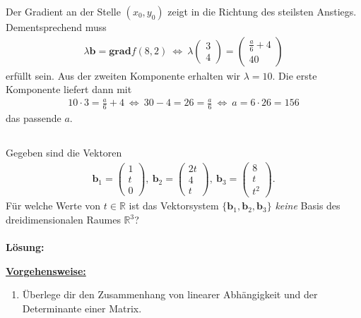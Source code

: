 Der Gradient an der Stelle $ (x_0,y_0) $ zeigt in die Richtung des steilsten Anstiegs. Dementsprechend muss
\begin{align*}
\lambda \textbf{b} = \textbf{grad} f(8,2)
\ \Leftrightarrow \
\lambda 
\begin{pmatrix}
3 \\ 4
\end{pmatrix}
= 
\begin{pmatrix}
\frac{a}{6} + 4\\
40
\end{pmatrix}
\end{align*}
erfüllt sein. Aus der zweiten Komponente erhalten wir $ \lambda = 10 $.
Die erste Komponente liefert dann mit
\begin{align*}
10 \cdot 3 = \frac{a}{6} + 4
\ \Leftrightarrow \
30  - 4 = 26 =  \frac{a}{6}
\ \Leftrightarrow \
a = 6 \cdot 26 = 156
\end{align*}
das passende $ a $.


\newpage

\subsection*{}
Gegeben sind die Vektoren
\begin{align*}
\textbf{b}_1 =
\begin{pmatrix}
1 \\
t\\ 
0
\end{pmatrix},
\
\textbf{b}_2 =
\begin{pmatrix}
2t \\
4\\ 
t
\end{pmatrix},
\
\textbf{b}_3 =
\begin{pmatrix}
8 \\
t\\ 
t^2
\end{pmatrix}.
\end{align*}
Für welche Werte von $ t \in \mathbb{R} $ ist das Vektorsystem $ \{ \textbf{b}_1, \textbf{b}_2, \textbf{b}_3 \} $ \textit{keine} Basis des dreidimensionalen Raumes $ \mathbb{R}^3 $?
\\
\\
\textbf{Lösung:}
\begin{mdframed}
\underline{\textbf{Vorgehensweise:}}
\renewcommand{\labelenumi}{\theenumi.}
\begin{enumerate}
\item Überlege dir den Zusammenhang von linearer Abhängigkeit und der Determinante einer Matrix.
\end{enumerate}
\end{mdframed}

